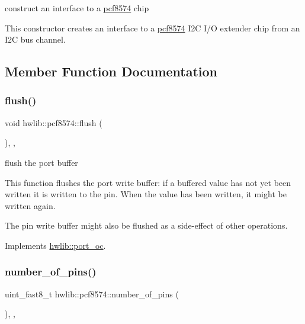 construct an interface to a \hyperlink{classhwlib_1_1pcf8574}{pcf8574} chip

This constructor creates an interface to a \hyperlink{classhwlib_1_1pcf8574}{pcf8574} I2C I/O extender chip from an I2C bus channel. 

\subsection{Member Function Documentation}
\mbox{\label{classhwlib_1_1pcf8574_a713a1ba3f48773641258ba1afdfc0127}} 
\subsubsection{\texorpdfstring{flush()}{flush()}}
{\footnotesize\ttfamily void hwlib\+::pcf8574\+::flush (\begin{DoxyParamCaption}{ }\end{DoxyParamCaption})\hspace{0.3cm}{\ttfamily [inline]}, {\ttfamily [override]}, {\ttfamily [virtual]}}





flush the port buffer

This function flushes the port write buffer\+: if a buffered value has not yet been written it is written to the pin. When the value has been written, it might be written again.

The pin write buffer might also be flushed as a side-\/effect of other operations. 

Implements \hyperlink{classhwlib_1_1port__oc_a49b64bd24431b35e92e208df84327dae}{hwlib\+::port\+\_\+oc}.

\mbox{\label{classhwlib_1_1pcf8574_abfe747fc30037f016334e2915a08f31a}} 
\subsubsection{\texorpdfstring{number\+\_\+of\+\_\+pins()}{number\_of\_pins()}}
{\footnotesize\ttfamily uint\+\_\+fast8\+\_\+t hwlib\+::pcf8574\+::number\+\_\+of\+\_\+pins (\begin{DoxyParamCaption}{ }\end{DoxyParamCaption})\hspace{0.3cm}{\ttfamily [inline]}, {\ttfamily [override]}, {\ttfamily [virtual]}}





